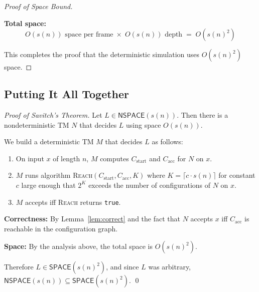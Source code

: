 \documentclass[12pt,a4paper]{article}
\theoremstyle{plain}
\theoremstyle{definition}
\theoremstyle{remark}
\newcommand{\SPACE}{\mathsf{SPACE}}
\newcommand{\NSPACE}{\mathsf{NSPACE}}
\begin{document}
\begin{proof}[Proof of Space Bound]
\begin{center}
\end{center}

\textbf{Total space:}
\[
  O(s(n)) \text{ space per frame} \;\times\; O(s(n)) \text{ depth} \;=\; O(s(n)^2)
\]

This completes the proof that the deterministic simulation uses $O(s(n)^2)$ space.
\end{proof}

\subsection{Putting It All Together}

\begin{proof}[Proof of Savitch's Theorem]
Let $L \in \NSPACE(s(n))$. Then there is a nondeterministic TM $N$ that decides $L$ using space $O(s(n))$.

We build a deterministic TM $M$ that decides $L$ as follows:
\begin{enumerate}
  \item On input $x$ of length $n$, $M$ computes $C_{\text{start}}$ and $C_{\text{acc}}$ for $N$ on $x$.
  \item $M$ runs algorithm \textsc{Reach}$(C_{\text{start}}, C_{\text{acc}}, K)$ where $K = \lceil c \cdot s(n) \rceil$ for constant $c$ large enough that $2^K$ exceeds the number of configurations of $N$ on $x$.
  \item $M$ accepts iff \textsc{Reach} returns \texttt{true}.
\end{enumerate}

\textbf{Correctness:} By Lemma~\ref{lem:correct} and the fact that $N$ accepts $x$ iff $C_{\text{acc}}$ is reachable in the configuration graph.

\textbf{Space:} By the analysis above, the total space is $O(s(n)^2)$.

Therefore $L \in \SPACE(s(n)^2)$, and since $L$ was arbitrary, $\NSPACE(s(n)) \subseteq \SPACE(s(n)^2)$. \qed
\end{proof}
\end{document}
